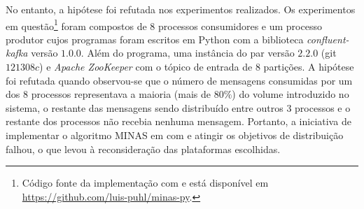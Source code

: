 No entanto, a hipótese foi refutada nos experimentos realizados.
Os experimentos em questão\footnote{
  Código fonte da implementação com \python e \kafka está disponível em \url{https://github.com/luis-puhl/minas-py}.
} foram compostos de 8 processos
consumidores e um processo produtor cujos programas foram escritos em Python com
a biblioteca \emph{confluent-kafka} versão $1.0.0$.
Além do programa, uma instância do par \kafka versão $2.2.0$ (git $121308c$) e
\emph{Apache ZooKeeper} com o tópico de entrada de 8 partições.
A hipótese foi refutada quando observou-se que o número de
mensagens consumidas por um dos $8$ processos representava a maioria (mais de
$80\%$) do volume introduzido no sistema, o restante das mensagens sendo distribuído entre
outros $3$ processos e o restante dos processos não recebia nenhuma mensagem.
Portanto, a iniciativa de implementar o algoritmo MINAS em \python com \kafka e
atingir os objetivos de distribuição falhou, o que levou à reconsideração das
plataformas escolhidas.





